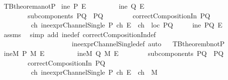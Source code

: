 \begin{isabellebody}
%
\endisadelimproof
\isanewline
{}\isamarkupfalse%
\ TBtheorem{}a{\isacharunderscore}notP{}{\isacharcolon}\isanewline
{}\ {\isachardoublequoteopen}ine\ P\ E{\isachardoublequoteclose}\isanewline
\ \ \ \ \ \ \ \ {\isachardoublequoteopen}{\isasymnot}\ ine\ Q\ E{\isachardoublequoteclose}\isanewline
\ \ \ \ \ \ \ \ {\isachardoublequoteopen}subcomponents\ PQ\ {\isacharequal}\ {\isacharbraceleft}P{\isacharcomma}Q{\isacharbraceright}{\isachardoublequoteclose}\isanewline
\ \ \ \ \ \ \ \ {\isachardoublequoteopen}correctCompositionIn\ PQ{\isachardoublequoteclose}\ \isanewline
\ \ \ \ \ \ \ \ {\isachardoublequoteopen}{\isasymexists}\ ch{\isachardot}\ {\isacharparenleft}{\isacharparenleft}ine{\isacharunderscore}exprChannelSingle\ P\ ch\ E{\isacharparenright}\ {\isasymand}\ {\isacharparenleft}ch\ {\isasymin}\ {\isacharparenleft}loc\ PQ{\isacharparenright}{\isacharparenright}{\isacharparenright}{\isachardoublequoteclose}\isanewline
{}\ \ \ \ {\isachardoublequoteopen}{\isasymnot}\ ine\ PQ\ E{\isachardoublequoteclose}\isanewline
%
\isadelimproof
%
\endisadelimproof
%
\isatagproof
{}\isamarkupfalse%
\ assms\ \isanewline
{}\isamarkupfalse%
\ {\isacharparenleft}simp\ add{\isacharcolon}\ ine{\isacharunderscore}def\ correctCompositionIn{\isacharunderscore}def\ \isanewline
\ \ \ \ \ \ \ \ \ \ \ \ \ \ \ \ \ \ \ \ \ ine{\isacharunderscore}exprChannelSingle{\isacharunderscore}def{\isacharcomma}\ auto{\isacharparenright}%
\endisatagproof
{\isafoldproof}%
%
\isadelimproof
\ \isanewline
%
\endisadelimproof
\isanewline
{}\isamarkupfalse%
\ TBtheorem{}b{\isacharunderscore}notP{}{\isacharcolon}\isanewline
{}\ {\isachardoublequoteopen}ineM\ P\ M\ E{\isachardoublequoteclose}\isanewline
\ \ \ \ \ \ \ \ {\isachardoublequoteopen}{\isasymnot}\ ineM\ Q\ M\ E{\isachardoublequoteclose}\isanewline
\ \ \ \ \ \ \ \ {\isachardoublequoteopen}subcomponents\ PQ\ {\isacharequal}\ {\isacharbraceleft}P{\isacharcomma}Q{\isacharbraceright}{\isachardoublequoteclose}\isanewline
\ \ \ \ \ \ \ \ {\isachardoublequoteopen}correctCompositionIn\ PQ{\isachardoublequoteclose}\ \ \isanewline
\ \ \ \ \ \ \ \ {\isachardoublequoteopen}{\isasymexists}\ ch{\isachardot}\ {\isacharparenleft}{\isacharparenleft}ine{\isacharunderscore}exprChannelSingle\ P\ ch\ E{\isacharparenright}\ {\isasymand}\ {\isacharparenleft}ch\ {\isasymin}\ M{\isacharparenright}\ \isanewline

\end{isabellebody}

